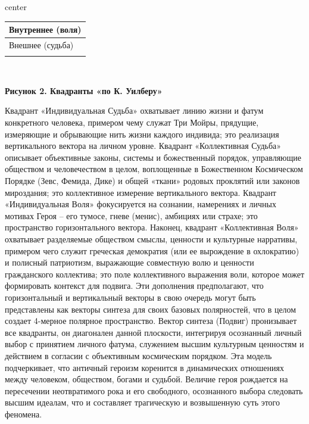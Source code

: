     \begin{adjustbox}{center}\begin{tabular}{ |l| }
      \hline
      {\centering Внутреннее (воля) \par} \\
      \hline
      {\centering Внешнее (судьба) \par} \\
      \hline
       \\
      \hline
    \end{tabular}\end{adjustbox}\
    {\centering \textbf{Рисунок 2. Квадранты «по К. Уилберу»} \par}

    Квадрант «Индивидуальная Судьба» охватывает линию жизни и фатум конкретного человека, примером чему служат Три Мойры, прядущие, измеряющие и обрывающие нить жизни каждого индивида; это реализация вертикального вектора на личном уровне. 
    Квадрант «Коллективная Судьба» описывает объективные законы, системы и божественный порядок, управляющие обществом и человечеством в целом, воплощенные в Божественном Космическом Порядке (Зевс, Фемида, Дике) и общей «ткани» родовых проклятий или законов мироздания; это коллективное измерение вертикального вектора. 
    Квадрант «Индивидуальная Воля» фокусируется на сознании, намерениях и личных мотивах Героя – его тумосе, гневе (менис), амбициях или страхе; это пространство горизонтального вектора. 
    Наконец, квадрант «Коллективная Воля» охватывает разделяемые обществом смыслы, ценности и культурные нарративы, примером чего служит греческая демократия (или ее вырождение в охлократию) и полисный патриотизм, выражающие совместную волю и ценности гражданского коллектива; это поле коллективного выражения воли, которое может формировать контекст для подвига. Эти дополнения предполагают, что горизонтальный и вертикальный векторы в свою очередь могут быть представлены как векторы синтеза для своих базовых полярностей, что в целом создает 4-мерное полярное пространство.
    Вектор синтеза (Подвиг) пронизывает все квадранты, он диагонален данной плоскости, интегрируя осознанный личный выбор с принятием личного фатума, служением высшим культурным ценностям и действием в согласии с объективным космическим порядком. Эта модель подчеркивает, что античный героизм коренится в динамических отношениях между человеком, обществом, богами и судьбой. Величие героя рождается на пересечении неотвратимого рока и его свободного, осознанного выбора следовать высшим идеалам, что и составляет трагическую и возвышенную суть этого феномена.

